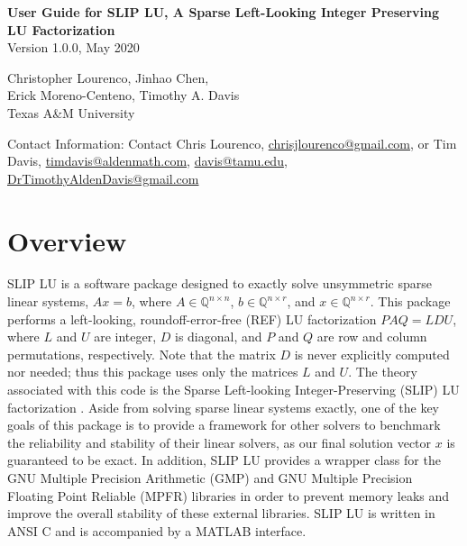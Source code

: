 \documentclass[12pt]{article}
\theoremstyle{definition}
\begin{document}
\begin{center}
\begin{large}
\textbf{User Guide for SLIP LU, A Sparse Left-Looking Integer
Preserving LU Factorization} \\
\vspace{5mm}
Version 1.0.0, May 2020 %
\vspace{20mm}

Christopher Lourenco, Jinhao Chen, \\ Erick Moreno-Centeno, Timothy A. Davis \\

Texas A\&M University

\vspace{20mm}
Contact Information: Contact Chris Lourenco, \href{mailto:chrisjlourenco@gmail.com}{chrisjlourenco@gmail.com}, or Tim Davis,
\href{mailto:timdavis@aldenmath.com}{timdavis@aldenmath.com},
\href{mailto:davis@tamu.edu}{davis@tamu.edu},
\href{DrTimothyAldenDavis@gmail.com}{DrTimothyAldenDavis@gmail.com}

\end{large}
\end{center}

\newpage
\tableofcontents

\newpage

\section{Overview}
\label{s:intro}

SLIP LU is a software package designed to exactly solve unsymmetric sparse
linear systems, $ A x = b$, where $A \in \mathbb{Q}^{n \times
n}$, $b \in \mathbb{Q}^{n \times r}$, and $x \in \mathbb{Q}^{n \times
r}$. This package performs a left-looking, roundoff-error-free (REF) LU
factorization $P A Q = L D U$, where $L$ and $U$ are integer, $D$ is diagonal,
and $P$ and $Q$ are row and column permutations, respectively. 
Note that the matrix $D$ is never explicitly computed nor needed; thus this 
package uses only the matrices $L$ and $U$. The theory associated with this code 
is the Sparse Left-looking Integer-Preserving (SLIP) LU factorization
 \cite{lourenco2019exact}. Aside from
solving sparse linear systems exactly, one of the key goals of this package is
to provide a framework for other solvers to benchmark the reliability and
stability of their linear solvers, as our final solution vector $x$ is
guaranteed to be exact. In addition, SLIP LU provides a wrapper class for the
GNU Multiple Precision Arithmetic (GMP) \cite{granlund2015gnu} and GNU Multiple
Precision Floating Point Reliable (MPFR) \cite{fousse2007mpfr} libraries in
order to prevent memory leaks and improve the overall stability of these
external libraries. SLIP LU is written in ANSI C and is accompanied by a MATLAB
interface.
\end{document}
